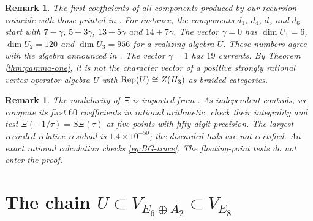 \documentclass[leqno]{article}
\let\cal\relax
\newcommand{\cal}{\mathcal}
\DeclareMathOperator{\Rep}{Rep}
\newtheorem{remark}[thm]{Remark}
\numberwithin{equation}{section}
\begin{document}
\begin{remark}\normalfont
\label{rem:EG-coefficients}
The first coefficients of all components produced by our recursion coincide with those printed in \cite[p.~22]{EvG11}. For instance, the components $d_1$, $d_4$, $d_5$ and $d_6$ start with $7-\gamma$, $5-3\gamma$, $13-5\gamma$ and $14+7\gamma$. The vector $\gamma = 0$ has $\dim U_1 = 6$, $\dim U_2 = 120$ and $\dim U_3 = 956$ for a realizing algebra $U$. These numbers agree with the algebra announced in \cite{Rie26,Hua26}. The vector $\gamma = 1$ has $19$ currents. By Theorem \ref{thm:gamma-one}, it is not the character vector of a positive strongly rational vertex operator algebra $U$ with $\Rep(U) \cong Z(\cal H_3)$ as braided categories.
\end{remark}

\begin{remark}\normalfont
The modularity of $\Xi$ is imported from \cite[Section 2.4]{EvG11}. As independent controls, we compute its first $60$ coefficients in rational arithmetic, check their integrality and test $\Xi(-1/\tau) = S\Xi(\tau)$ at five points with fifty-digit precision. The largest recorded relative residual is $1.4\times10^{-50}$; the discarded tails are not certified. An exact rational calculation checks \eqref{eq:BG-trace}. The floating-point tests do not enter the proof.
\end{remark}

\section{The chain \texorpdfstring{$U \subset V_{E_6 \oplus A_2} \subset V_{E_8}$}{U < V(E6+A2) < V(E8)}}
\label{sec:chain}
\end{document}
